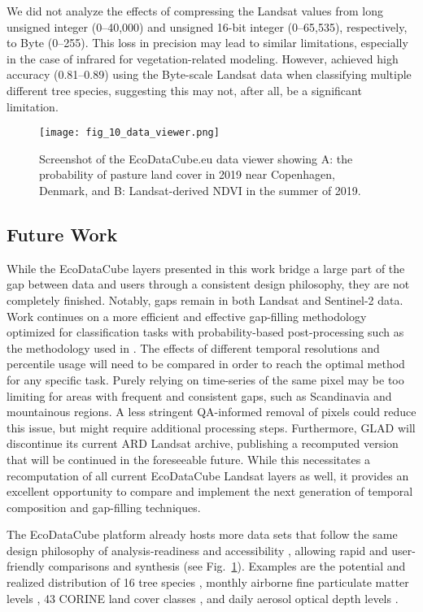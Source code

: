We did not analyze the effects of compressing the Landsat values from long unsigned integer (0--40,000) and unsigned 16-bit integer (0--65,535), respectively, to Byte (0--255). This loss in precision may lead to similar limitations, especially in the case of infrared for vegetation-related modeling. However, \citet{bonannella2022forest} achieved high accuracy (0.81--0.89) using the Byte-scale Landsat data when classifying multiple different tree species, suggesting this may not, after all, be a significant limitation.

\begin{figure}[p]
\texttt{[image: fig\_10\_data\_viewer.png]}
\caption{Screenshot of the EcoDataCube.eu data viewer showing A: the probability of pasture land cover in 2019 near Copenhagen, Denmark, and B: Landsat-derived NDVI in the summer of 2019.}
\label{fig:10_dataviewer_pasture}
\end{figure}

\subsection*{Future Work}
    
While the EcoDataCube layers presented in this work bridge a large part of the gap between data and users through a consistent design philosophy, they are not completely finished. Notably, gaps remain in both Landsat and Sentinel-2 data. Work continues on a more efficient and effective gap-filling methodology optimized for classification tasks with probability-based post-processing such as the methodology used in \citet{witjes2022spatiotemporal}. The effects of different temporal resolutions and percentile usage will need to be compared in order to reach the optimal method for any specific task. Purely relying on time-series of the same pixel may be too limiting for areas with frequent and consistent gaps, such as Scandinavia and mountainous regions. A less stringent QA-informed removal of pixels could reduce this issue, but might require additional processing steps. Furthermore, GLAD will discontinue its current ARD Landsat archive, publishing a recomputed version that will be continued in the foreseeable future. While this necessitates a recomputation of all current EcoDataCube Landsat layers as well, it provides an excellent opportunity to compare and implement the next generation of temporal composition and gap-filling techniques.
        
The EcoDataCube platform already hosts more data sets that follow the same design philosophy of analysis-readiness and accessibility \citep{wagemann2021a}, allowing rapid and user-friendly comparisons and synthesis (see Fig.\@~\ref{fig:10_dataviewer_pasture}). Examples are the potential and realized distribution of 16 tree species \citep{bonannella2022forest}, monthly airborne fine particulate matter levels \citep{ibrahim2022machine}, 43 CORINE land cover classes \citep{witjes2022spatiotemporal}, and daily aerosol optical depth levels \citep{ibrahim2021space}. 

